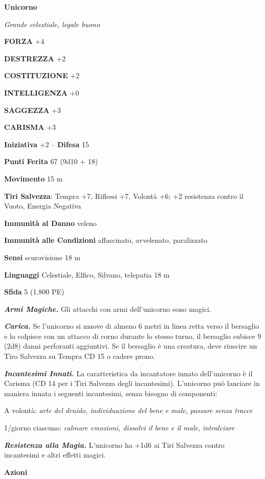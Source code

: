 \begin{multicols}{2}
\medskip{}\textbf{Unicorno}

\emph{Grande celestiale, legale buono}

\textbf{FORZA} +4

\textbf{DESTREZZA} +2

\textbf{COSTITUZIONE} +2

\textbf{INTELLIGENZA} +0

\textbf{SAGGEZZA} +3

\textbf{CARISMA} +3

\textbf{Iniziativa} +2 -- \textbf{Difesa} 15

\textbf{Punti Ferita} 67 (9d10 + 18)

\textbf{Movimento} 15 m

\textbf{Tiri Salvezza}: Tempra +7, Riflessi +7, Volontà +6; +2 resistenza contro il Vuoto, Energia Negativa

\textbf{Immunità al Danno} veleno

\textbf{Immunità alle Condizioni} affascinato, avvelenato, paralizzato

\textbf{Sensi} scurovisione 18 m

\textbf{Linguaggi} Celestiale, Elfico, Silvano, telepatia 18 m

\textbf{Sfida} 5 (1.800 PE)

\emph{\textbf{Armi Magiche.}} Gli attacchi con armi dell'unicorno sono magici.

\emph{\textbf{Carica.}} Se l'unicorno si muove di almeno 6 metri in linea retta verso il bersaglio e lo colpisce con un attacco di corno durante lo stesso turno, il bersaglio subisce 9 (2d8) danni perforanti aggiuntivi. Se il bersaglio è una creatura, deve riuscire un Tiro Salvezza su Tempra CD 15 o cadere prono.

\emph{\textbf{Incantesimi Innati.}} La caratteristica da incantatore innato dell'unicorno è il Carisma (CD 14 per i Tiri Salvezza degli incantesimi). L'unicorno può lanciare in maniera innata i seguenti incantesimi, senza bisogno di componenti:

A volontà: \emph{arte del druido, individuazione del bene e male,} \emph{passare senza tracce}

1/giorno ciascuno: \emph{calmare emozioni, dissolvi il bene e il male,} \emph{intralciare}

\emph{\textbf{Resistenza alla Magia.}} L'unicorno ha +1d6 ai Tiri Salvezza contro incantesimi e altri effetti magici. 

\textbf{Azioni}


\end{multicols}
